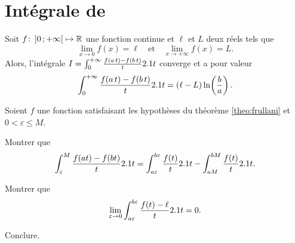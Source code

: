 \section{Intégrale de }





\begin{theo}\label{theo:frullani}
Soit $\fonctionligne[f]{\interoo{0}{+\infty}}{\R}$ une fonction continue et $\ell$ et $L$ deux réels tels que
\[
\lim_{x\to0} f(x) = \ell
\quad \text{et} \quad 
\lim_{x\to+\infty} f(x) = L.
\]
Alors, l'intégrale $I = \int_0^{+\infty} \frac{f(a \, t) - f(b \, t)}{t} \d t$ converge et a pour valeur
\[
\int_0^{+\infty} \frac{f(a \, t) - f(b \, t)}{t} \d t = (\ell - L) \ln\mathopen{}\left(\frac{b}{a}\right).
\]
\end{theo}

\begin{exercice}
Soient $f$ une fonction satisfaisant les hypothèses du théorème \ref{theo:frullani} et $0 < \varepsilon \leqslant M$.
\begin{questions}
\item Montrer que
\[
\int_\varepsilon^M \frac{f(a t) - f(b t)}{t} \d t
= \int_{a\varepsilon}^{b\varepsilon} \frac{f(t)}{t} \d t - \int_{a M}^{b M} \frac{f(t)}{t} \d t.
\]

\item Montrer que
\[
\lim_{\varepsilon \to 0} \int_{a\varepsilon}^{b\varepsilon} \frac{f(t) - \ell}{t} \d t = 0.
\]

\item Conclure.
\end{questions}
\end{exercice}

